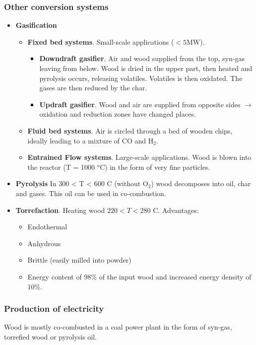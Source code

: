 \documentclass[a4paper,10pt]{article}
\begin{document}
\subsubsection{Other conversion systems}
\begin{itemize}
 \item \textbf{Gasification}
 \begin{itemize}
 \item \textbf{Fixed bed systems}. Small-scale applications ($<5$MW).
 \begin{itemize}
 \item \textbf{Downdraft gasifier}. Air and wood supplied from the top, syn-gas leaving from below. Wood is dried in the upper part, then heated and pyrolysis occurs, releasing volatiles. Volatiles is then oxidated. The gases are then reduced by the char.
 \item \textbf{Updraft gasifier}. Wood and air are supplied from opposite sides $\rightarrow$ oxidation and reduction zones have changed places.
 \end{itemize}
 \item \textbf{Fluid bed systems}. Air is circled through a bed of wooden chips, ideally leading to a mixture of CO and H$_2$.
 \item \textbf{Entrained Flow systems}. Large-scale applications. Wood is blown into the reactor (T = 1000 $^o$C) in the form of very fine particles.
 \end{itemize}
 \item \textbf{Pyrolysis} In 300 < T < 600 C (without O$_2$) wood decomposes into oil, char and gases. This oil can be used in co-combustion.
 \item \textbf{Torrefaction}. Heating wood $220 < T < 280$ C. Advantages:
 \begin{itemize}
  \item Endothermal
  \item Anhydrous
  \item Brittle (easily milled into powder)
  \item Energy content of 98\% of the input wood and increased energy density of 10\%.
 \end{itemize}
\end{itemize}


\subsubsection{Production of electricity}
Wood is mostly co-combusted in a coal power plant in the form of syn-gas, torrefied wood or pyrolysis oil.
\end{document}
